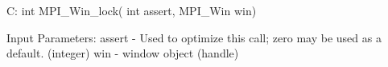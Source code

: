 C:
int MPI_Win_lock( int assert, MPI_Win win)

Input Parameters:
assert - Used to optimize this call; zero may be used as a default. (integer)
win - window object (handle)
